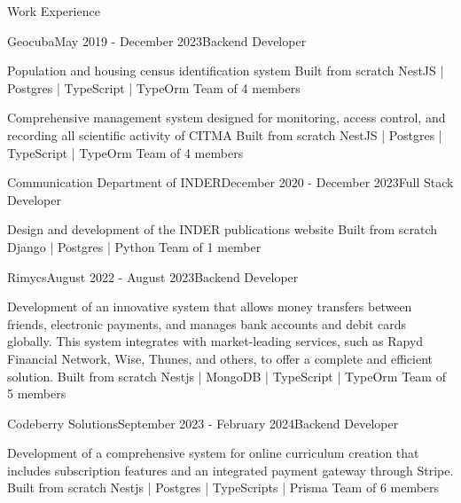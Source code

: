 \documentclass{resume}
\begin{document}
	
	\begin{rSection}{Work Experience}
		\begin{rSubsection}{Geocuba}{May 2019 - December 2023}{Backend Developer}{}
			\item Population and housing census identification system 
			\subitem Built from scratch
			\subitem NestJS | Postgres | TypeScript | TypeOrm
			\subitem Team of 4 members
			\newline
			
			\item Comprehensive management system designed for monitoring, access control, and recording all scientific activity of CITMA
			\subitem Built from scratch
			\subitem NestJS | Postgres | TypeScript | TypeOrm
			\subitem Team of 4 members
		\end{rSubsection}
		
		\begin{rSubsection}{Communication Department of INDER}{December 2020 - December 2023}{Full Stack Developer}{}
			\item Design and development of the INDER publications website 
			\subitem Built from scratch
			\subitem Django | Postgres | Python
			\subitem Team of 1 member
			
		\end{rSubsection}
		
		\begin{rSubsection}{Rimycs}{August 2022 - August 2023}{Backend Developer}{}
			\item Development of an innovative system that allows money transfers between friends, electronic payments, and manages bank accounts and debit cards globally. This system integrates with market-leading services, such as Rapyd Financial Network, Wise, Thunes, and others, to offer a complete and efficient solution.
			\subitem Built from scratch
			\subitem Nestjs | MongoDB | TypeScript | TypeOrm
			\subitem Team of 5 members
			
		\end{rSubsection}	
		
		\begin{rSubsection}{Codeberry Solutions}{September 2023 - February 2024}{Backend Developer}{}
			\item Development of a comprehensive system for online curriculum creation that includes subscription features and an integrated payment gateway through Stripe.
			\subitem Built from scratch
			\subitem Nestjs | Postgres | TypeScripts | Prisma
			\subitem Team of 6 members
			

\end{rSubsection}
\end{rSection}
\end{document}
